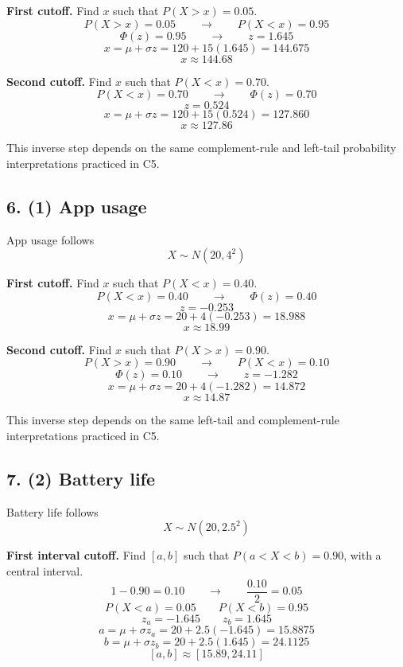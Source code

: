 	\textbf{First cutoff.} Find \(x\) such that \(P(X>x)=0.05\).
	\[
	P(X>x)=0.05
	\qquad \longrightarrow \qquad
	P(X<x)=0.95
	\]
	\[
	\Phi(z)=0.95
	\qquad \longrightarrow \qquad
	z=1.645
	\]
	\[
	x=\mu+\sigma z
	=120+15(1.645)
	=144.675
	\]
	\[
	x\approx 144.68
	\]
	
	\textbf{Second cutoff.} Find \(x\) such that \(P(X<x)=0.70\).
	\[
	P(X<x)=0.70
	\qquad \longrightarrow \qquad
	\Phi(z)=0.70
	\]
	\[
	z=0.524
	\]
	\[
	x=\mu+\sigma z
	=120+15(0.524)
	=127.860
	\]
	\[
	x\approx 127.86
	\]
	
	This inverse step depends on the same complement-rule and left-tail probability interpretations practiced in C5.
	
	
	\subsection*{6. (1) App usage}
	\label{subsec:inverse-normal-problems-c7-6}
	App usage follows
	\[
	X\sim N(20,4^2)
	\]
	
	\textbf{First cutoff.} Find \(x\) such that \(P(X<x)=0.40\).
	\[
	P(X<x)=0.40
	\qquad \longrightarrow \qquad
	\Phi(z)=0.40
	\]
	\[
	z=-0.253
	\]
	\[
	x=\mu+\sigma z
	=20+4(-0.253)
	=18.988
	\]
	\[
	x\approx 18.99
	\]
	
	\textbf{Second cutoff.} Find \(x\) such that \(P(X>x)=0.90\).
	\[
	P(X>x)=0.90
	\qquad \longrightarrow \qquad
	P(X<x)=0.10
	\]
	\[
	\Phi(z)=0.10
	\qquad \longrightarrow \qquad
	z=-1.282
	\]
	\[
	x=\mu+\sigma z
	=20+4(-1.282)
	=14.872
	\]
	\[
	x\approx 14.87
	\]
	
	This inverse step depends on the same left-tail and complement-rule interpretations practiced in C5.
	
	
	\subsection*{7. (2) Battery life}
	\label{subsec:inverse-normal-problems-c7-7}
	Battery life follows
	\[
	X\sim N(20,2.5^2)
	\]
	
	\textbf{First interval cutoff.} Find \([a,b]\) such that \(P(a<X<b)=0.90\), with a central interval.
	\[
	1-0.90=0.10
	\qquad \longrightarrow \qquad
	\frac{0.10}{2}=0.05
	\]
	\[
	P(X<a)=0.05
	\qquad
	P(X<b)=0.95
	\]
	\[
	z_a=-1.645
	\qquad
	z_b=1.645
	\]
	\[
	a=\mu+\sigma z_a
	=20+2.5(-1.645)
	=15.8875
	\]
	\[
	b=\mu+\sigma z_b
	=20+2.5(1.645)
	=24.1125
	\]
	\[
	[a,b]\approx[15.89,24.11]
	\]
	

